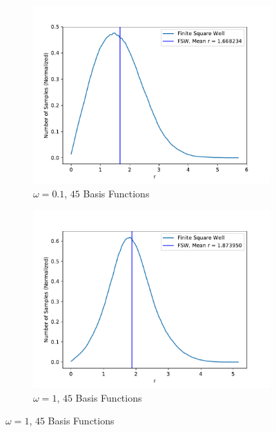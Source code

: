 \documentclass[../main.tex]{subfiles}
\begin{document}
\begin{figure}
\medskip
\begin{subfigure}{0.48\textwidth}
\includegraphics[width=\linewidth]{figures/densityFSW/density_FSW_N2_Omega010_2d_BF45.pdf}
\caption{$\omega=0.1$, $45$ Basis Functions} \label{fig:FSW_N2_2d_c}
\end{subfigure}\hspace*{\fill}
\begin{subfigure}{0.48\textwidth}
\includegraphics[width=\linewidth]{figures/densityFSW/density_FSW_N2_Omega1_2d_BF45.pdf}
\caption{$\omega=1$, $45$ Basis Functions} \label{fig:FSW_N2_2d_d}
\end{subfigure}


\end{figure}
\end{document}
